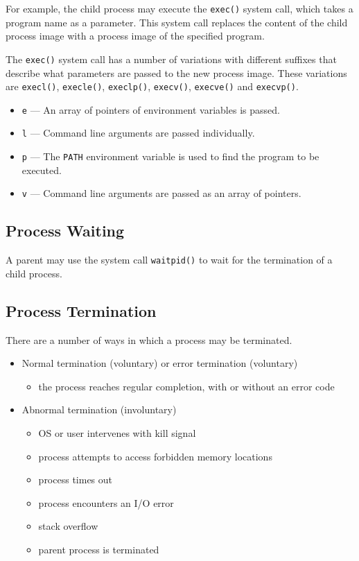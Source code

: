 For example, the child process may execute the \texttt{exec()} system call, which takes a program name as a parameter.
This system call replaces the content of the child process image with a process image of the specified program.

The \texttt{exec()} system call has a number of variations with different suffixes that describe what parameters are passed to the new process image.
These variations are \texttt{execl()}, \texttt{execle()}, \texttt{execlp()}, \texttt{execv()}, \texttt{execve()} and \texttt{execvp()}.

\begin{itemize}
  \item \texttt{e} --- An array of pointers of environment variables is passed.
  \item \texttt{l} --- Command line arguments are passed individually.
  \item \texttt{p} --- The \texttt{PATH} environment variable is used to find the program to be executed.
  \item \texttt{v} --- Command line arguments are passed as an array of pointers.
\end{itemize}

\subsection{Process Waiting}

A parent may use the system call \texttt{waitpid()} to wait for the termination of a child process.

\subsection{Process Termination}

There are a number of ways in which a process may be terminated.
\begin{itemize}
  \item Normal termination (voluntary) or error termination (voluntary)
  \begin{itemize}
    \item the process reaches regular completion, with or without an error code
  \end{itemize}
  \item Abnormal termination (involuntary)
  \begin{itemize}
    \item OS or user intervenes with kill signal
    \item process attempts to access forbidden memory locations
    \item process times out
    \item process encounters an I/O error
    \item stack overflow
    \item parent process is terminated
  \end{itemize}
\end{itemize}

